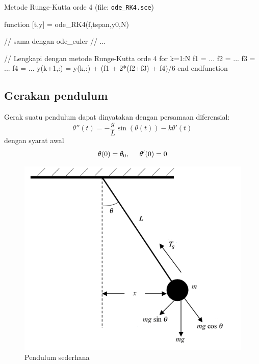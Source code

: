 \documentclass[10pt,bahasa]{article}
\begin{document}
Metode Runge-Kutta orde 4 (file: \texttt{ode\_RK4.sce})

\begin{scilabcode}
function [t,y] = ode_RK4(f,tspan,y0,N)
  
  // sama dengan ode_euler
  // ...

  // Lengkapi dengan metode Runge-Kutta orde 4
  for k=1:N
    f1 = ...
    f2 = ...
    f3 = ...
    f4 = ...
    y(k+1,:) = y(k,:) + (f1 + 2*(f2+f3) + f4)/6
  end
endfunction
\end{scilabcode}


\subsection{Gerakan pendulum}

Gerak suatu pendulum dapat dinyatakan dengan persamaan diferensial:
\begin{equation}
\theta''(t) = -\frac{g}{L}\sin(\theta(t)) - k\theta'(t)
\end{equation}
dengan syarat awal
\begin{equation}
\theta(0) = \theta_0, \hspace{0.5cm} \theta'(0) = 0
\end{equation}

\begin{figure}[H]
\centering
\includegraphics[scale=0.4]{images/pendulum.png}
\par
\caption{Pendulum sederhana}
\end{figure}
\end{document}

